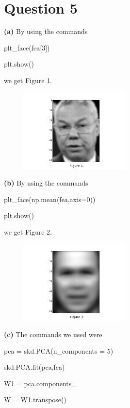 \documentclass[leqno]{article}
\begin{document}
\hfill
\section*{Question 5} \textbf{(a)} By using the commands

\noindent plt\_face(fea[3])

\noindent plt.show()

\noindent we get Figure 1.

\begin{figure}[h!]
\includegraphics[width=0.5\textwidth]{face3}  
\end{figure}

\noindent \textbf{(b)} By using the commands 

\noindent plt\_face(np.mean(fea,axis=0))

\noindent plt.show()

\noindent we get Figure 2.

\begin{figure}[h!]
\includegraphics[width=0.5\textwidth]{mean_face}  
\end{figure}

\hfill

\noindent \textbf{(c)} The commands we used were

\noindent pca = skd.PCA(n\_components = 5)

\noindent skd.PCA.fit(pca,fea)

\noindent W1 = pca.components\_

\noindent W = W1.transpose()
\end{document}
